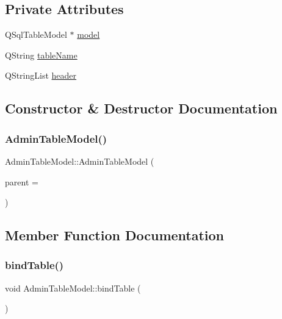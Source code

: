 \subsection*{Private Attributes}
\begin{DoxyCompactItemize}
\item 
Q\+Sql\+Table\+Model $\ast$ \mbox{\hyperlink{class_admin_table_model_a3b69ce64a42913beec5f71b44eeb5dee}{model}}
\item 
Q\+String \mbox{\hyperlink{class_admin_table_model_aa0c4f5fa7a71cc6b253af2fd58f9d92c}{table\+Name}}
\item 
Q\+String\+List \mbox{\hyperlink{class_admin_table_model_a6b2b624bbc5516ea248c5a4818121165}{header}}
\end{DoxyCompactItemize}


\subsection{Constructor \& Destructor Documentation}
\mbox{\label{class_admin_table_model_a19a985b406a9cc0a7d9c270c7e22e43e}} 
\subsubsection{\texorpdfstring{AdminTableModel()}{AdminTableModel()}}
{\footnotesize\ttfamily Admin\+Table\+Model\+::\+Admin\+Table\+Model (\begin{DoxyParamCaption}\item[{Q\+Object $\ast$}]{parent = {} }\end{DoxyParamCaption})\hspace{0.3cm}{\ttfamily [explicit]}}



\subsection{Member Function Documentation}
\mbox{\label{class_admin_table_model_a8f24c9bdafcd7d3b4f668b8893d64b59}} 
\subsubsection{\texorpdfstring{bindTable()}{bindTable()}}
{\footnotesize\ttfamily void Admin\+Table\+Model\+::bind\+Table (\begin{DoxyParamCaption}\item[{void}]{ }\end{DoxyParamCaption})}



